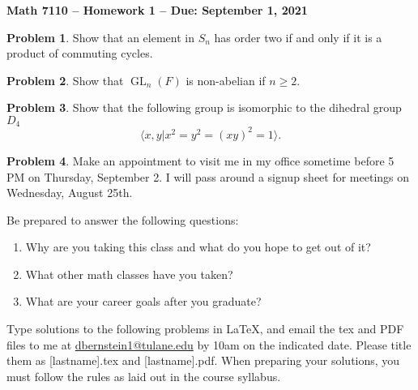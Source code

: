 \documentclass[letterpaper,11pt]{amsart}
\theoremstyle{plain}
\theoremstyle{definition}
\newtheorem{pr}{Problem}
\theoremstyle{remark}
\DeclareMathOperator{\gl}{GL}
\begin{document}
\Large

\begin{center}
{\bf Math 7110 -- Homework  1 --  Due:  September 1, 2021}
\end{center}

\normalsize



\medskip


\begin{pr}
    Show that an element in $S_n$ has order two if and only if it is a product of commuting cycles.
\end{pr}

\begin{pr}
    Show that $\gl_n(F)$ is non-abelian if $n \ge 2$.
\end{pr}

\begin{pr}
    Show that the following group is isomorphic to the dihedral group $D_4$
    \[
        \langle x,y | x^2=y^2=(xy)^2=1 \rangle.
    \]
\end{pr}

\begin{pr}
Make an appointment to visit me 
in my office sometime before 5 PM on Thursday, September 2.  I will pass around
a signup sheet for meetings on Wednesday, August 25th.

Be prepared
to answer the following questions:
\begin{enumerate}
\item  Why are you taking this class and what do you hope to get out of it?
\item  What other math classes have you taken?
\item  What are your career goals after you graduate?
\end{enumerate}
\end{pr}

\bigskip

Type solutions to the following problems in \LaTeX, and email the tex and PDF files to me at \url{dbernstein1@tulane.edu} by 10am on the indicated date.
Please title them as [lastname].tex and [lastname].pdf.
When preparing your solutions, you must follow the rules as laid out in the course syllabus.

\vspace{.5cm}

\end{document}
